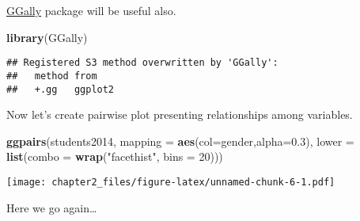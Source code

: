 \documentclass[
]{article}
\newenvironment{Shaded}{\begin{snugshade}}{\end{snugshade}}
\newcommand{\DataTypeTok}[1]{\textcolor[rgb]{0.13,0.29,0.53}{#1}}
\newcommand{\DecValTok}[1]{\textcolor[rgb]{0.00,0.00,0.81}{#1}}
\newcommand{\FloatTok}[1]{\textcolor[rgb]{0.00,0.00,0.81}{#1}}
\newcommand{\KeywordTok}[1]{\textcolor[rgb]{0.13,0.29,0.53}{\textbf{#1}}}
\newcommand{\NormalTok}[1]{#1}
\newcommand{\StringTok}[1]{\textcolor[rgb]{0.31,0.60,0.02}{#1}}
\begin{document}
\href{https://ggobi.github.io/ggally/}{GGally} package will be useful
also.

\begin{Shaded}
\begin{Highlighting}[]
\KeywordTok{library}\NormalTok{(GGally)}
\end{Highlighting}
\end{Shaded}

\begin{verbatim}
## Registered S3 method overwritten by 'GGally':
##   method from   
##   +.gg   ggplot2
\end{verbatim}

Now let's create pairwise plot presenting relationships among variables.

\begin{Shaded}
\begin{Highlighting}[]
\KeywordTok{ggpairs}\NormalTok{(students2014, }\DataTypeTok{mapping =} \KeywordTok{aes}\NormalTok{(}\DataTypeTok{col=}\NormalTok{gender,}\DataTypeTok{alpha=}\FloatTok{0.3}\NormalTok{), }\DataTypeTok{lower =} \KeywordTok{list}\NormalTok{(}\DataTypeTok{combo =} \KeywordTok{wrap}\NormalTok{(}\StringTok{"facethist"}\NormalTok{, }\DataTypeTok{bins =} \DecValTok{20}\NormalTok{)))}
\end{Highlighting}
\end{Shaded}

\texttt{[image: chapter2\_files/figure-latex/unnamed-chunk-6-1.pdf]}

Here we go again\ldots{}
\end{document}
